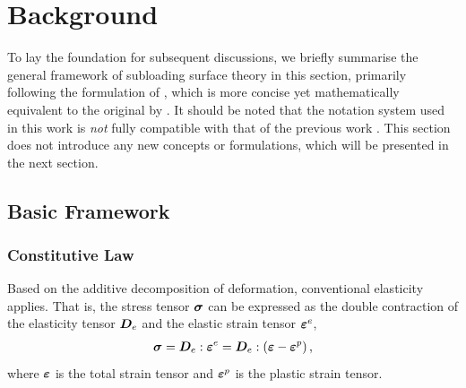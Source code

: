 \section{Background}\label{sec:background}
To lay the foundation for subsequent discussions, we briefly summarise the general framework of subloading surface theory in this section, primarily following the formulation of \citet{Chang2025}, which is more concise yet mathematically equivalent to the original by \citet{Hashiguchi2023a}.
It should be noted that the notation system used in this work is \textit{not} fully compatible with that of the previous work \citep{Chang2025}.
This section does not introduce any new concepts or formulations, which will be presented in the next section.
\subsection{Basic Framework}
\subsubsection{Constitutive Law}
Based on the additive decomposition of deformation, conventional elasticity applies.
That is, the stress tensor $\bm{\sigma}$ can be expressed as the double contraction of the elasticity tensor $\bm{D}_e$ and the elastic strain tensor $\bm{\varepsilon}^e$,
\begin{gather}
    \bm{\sigma}=\bm{D}_e:\bm{\varepsilon}^e=\bm{D}_e:\left(\bm{\varepsilon}-\bm{\varepsilon}^p\right),
\end{gather}
where $\bm{\varepsilon}$ is the total strain tensor and $\bm{\varepsilon}^p$ is the plastic strain tensor.
